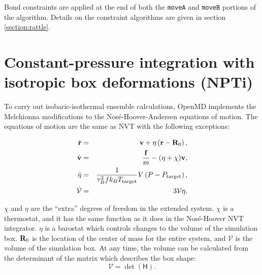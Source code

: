 \documentclass[]{book}
\begin{document}
Bond constraints are applied at the end of both the {\tt moveA} and
{\tt moveB} portions of the algorithm.  Details on the constraint
algorithms are given in section \ref{section:rattle}.

\section{\label{sec:NPTi}Constant-pressure integration with 
isotropic box deformations (NPTi)}

To carry out isobaric-isothermal ensemble calculations, {\sc OpenMD}
implements the Melchionna modifications to the Nos\'e-Hoover-Andersen
equations of motion.\cite{melchionna93} The equations of motion are
the same as NVT with the following exceptions:

\begin{eqnarray}
\dot{{\bf r}} & = & {\bf v} + \eta \left( {\bf r} - {\bf R}_0 \right), \\
\dot{{\bf v}} & = & \frac{{\bf f}}{m} - (\eta + \chi) {\bf v}, \\
\dot{\eta} & = & \frac{1}{\tau_{B}^2 f k_B T_{\mathrm{target}}} V \left( P -
P_{\mathrm{target}} \right), \\
\dot{\mathcal{V}} & = & 3 \mathcal{V} \eta .
\label{eq:melchionna1}
\end{eqnarray}

$\chi$ and $\eta$ are the ``extra'' degrees of freedom in the extended
system.  $\chi$ is a thermostat, and it has the same function as it
does in the Nos\'e-Hoover NVT integrator.  $\eta$ is a barostat which
controls changes to the volume of the simulation box.  ${\bf R}_0$ is
the location of the center of mass for the entire system, and
$\mathcal{V}$ is the volume of the simulation box.  At any time, the
volume can be calculated from the determinant of the matrix which
describes the box shape:
\begin{equation}
\mathcal{V} = \det(\mathsf{H}).
\end{equation}
\end{document}

